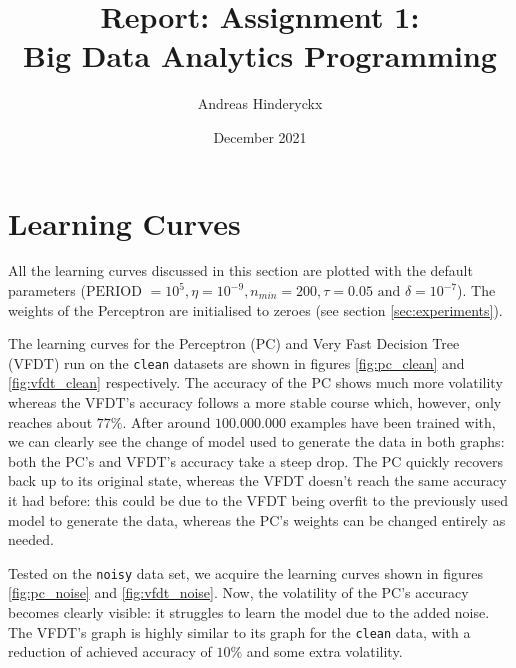 \documentclass[12pt]{article}
\title{Report: Assignment 1: \\Big Data Analytics Programming}
\author{Andreas Hinderyckx}
\date{December 2021}
\begin{document}
\newcommand{\todo}{\fbox{\textbf{\textcolor{red}{TODO}}} }
\newcommand{\sctf}[1]{10\mathrm{e}{-#1}}
\maketitle

\newpage

\section{Learning Curves}
All the learning curves discussed in this section are plotted with the default parameters ($\text{PERIOD } = 10^5, \eta = 10^{-9}, n_{min} = 200, \tau = 0.05 \text{ and } \delta = 10^{-7}$). The weights of the Perceptron are initialised to zeroes (see section \ref{sec:experiments}).

The learning curves for the Perceptron (PC) and Very Fast Decision Tree (VFDT) run on the \texttt{clean} datasets are shown in figures \ref{fig:pc_clean} and \ref{fig:vfdt_clean} respectively. The accuracy of the PC shows much more volatility whereas the VFDT's accuracy follows a more stable course which, however, only reaches about $77\%$. After around $100.000.000$ examples have been trained with, we can clearly see the change of model used to generate the data in both graphs: both the PC's and VFDT's accuracy take a steep drop. The PC quickly recovers back up to its original state, whereas the VFDT doesn't reach the same accuracy it had before: this could be due to the VFDT being overfit to the previously used model to generate the data, whereas the PC's weights can be changed entirely as needed.	

Tested on the \texttt{noisy} data set, we acquire the learning curves shown in figures \ref{fig:pc_noise} and \ref{fig:vfdt_noise}. Now, the volatility of the PC's accuracy becomes clearly visible: it struggles to learn the model due to the added noise. The VFDT's graph is highly similar to its graph for the \texttt{clean} data, with a reduction of achieved accuracy of $10\%$ and some extra volatility.
\end{document}
